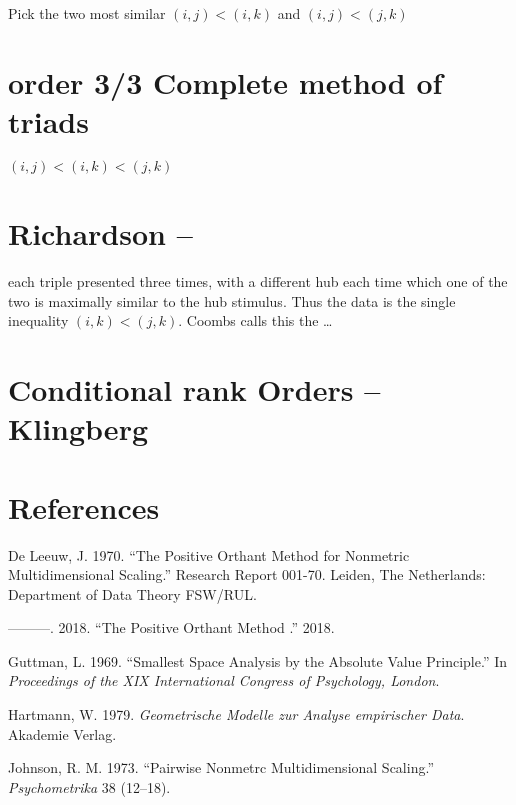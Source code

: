 \documentclass[
  12pt,
]{article}
\newlength{\cslhangindent}
\newenvironment{CSLReferences}[2] %
 {\begin{list}{}{%
  \setlength{\itemindent}{0pt}
  \setlength{\leftmargin}{0pt}
  \setlength{\parsep}{0pt}
  \ifodd #1
   \setlength{\leftmargin}{\cslhangindent}
   \setlength{\itemindent}{-1\cslhangindent}
  \fi
  \setlength{\itemsep}{#2\baselineskip}}}
 {\end{list}}
\begin{document}
Pick the two most similar
\((i,j)<(i,k)\) and \((i,j)<(j,k)\)

\section{order 3/3 Complete method of triads}\label{order-33-complete-method-of-triads}

\((i,j)<(i,k)<(j,k)\)

\section{Richardson --}\label{richardson}

each triple presented three times, with a different hub each time
which one of the two is maximally similar to the hub stimulus. Thus the data
is the single inequality \((i,k) < (j,k)\). Coombs calls this the \ldots{}

\section{Conditional rank Orders -- Klingberg}\label{conditional-rank-orders-klingberg}

\section*{References}\label{references}

\label{refs}
\begin{CSLReferences}{1}{0}
De Leeuw, J. 1970. {``The Positive Orthant Method for Nonmetric Multidimensional Scaling.''} Research Report 001-70. Leiden, The Netherlands: Department of Data Theory FSW/RUL.

---------. 2018. {``{The Positive Orthant Method }.''} 2018.

Guttman, L. 1969. {``{Smallest Space Analysis by the Absolute Value Principle}.''} In \emph{{Proceedings of the XIX International Congress of Psychology, London}}.

Hartmann, W. 1979. \emph{{Geometrische Modelle zur Analyse empirischer Data}}. Akademie Verlag.

Johnson, R. M. 1973. {``{Pairwise Nonmetrc Multidimensional Scaling}.''} \emph{Psychometrika} 38 (12--18).

\end{CSLReferences}
\end{document}
